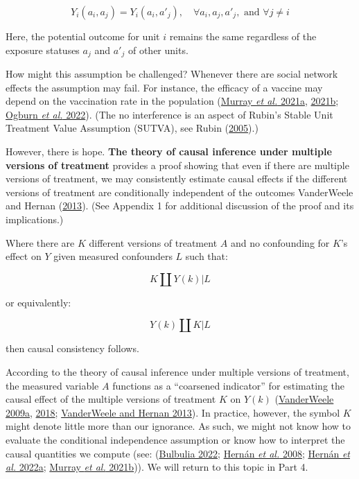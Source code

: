 \documentclass[
  singlecolumn]{article}
\begin{document}
\[
Y_i(a_i, a_j) = Y_i(a_i, a'_j), \quad \forall a_i, a_j, a'_j, \text{ and } \forall j \neq i
\]

Here, the potential outcome for unit \(i\) remains the same regardless
of the exposure statuses \(a_j\) and \(a'_j\) of other units.

How might this assumption be challenged? Whenever there are social
network effects the assumption may fail. For instance, the efficacy of a
vaccine may depend on the vaccination rate in the population
(\protect\hyperlink{ref-murray2021}{Murray \emph{et al.} 2021a},
\protect\hyperlink{ref-murray2021a}{2021b};
\protect\hyperlink{ref-ogburn2022}{Ogburn \emph{et al.} 2022}). (The no
interference is an aspect of Rubin's Stable Unit Treatment Value
Assumption (SUTVA), see Rubin
(\protect\hyperlink{ref-rubin2005}{2005}).)

However, there is hope. \textbf{The theory of causal inference under
multiple versions of treatment} provides a proof showing that even if
there are multiple versions of treatment, we may consistently estimate
causal effects if the different versions of treatment are conditionally
independent of the outcomes VanderWeele and Hernan
(\protect\hyperlink{ref-vanderweele2013}{2013}). (See Appendix 1 for
additional discussion of the proof and its implications.)

Where there are \(K\) different versions of treatment \(A\) and no
confounding for \(K\)'s effect on \(Y\) given measured confounders \(L\)
such that:

\[
K \coprod Y(k) | L
\]

or equivalently:

\[
Y(k) \coprod K | L
\]

then causal consistency follows.

According to the theory of causal inference under multiple versions of
treatment, the measured variable \(A\) functions as a ``coarsened
indicator'' for estimating the causal effect of the multiple versions of
treatment \(K\) on \(Y(k)\)
(\protect\hyperlink{ref-vanderweele2009}{VanderWeele 2009a},
\protect\hyperlink{ref-vanderweele2018}{2018};
\protect\hyperlink{ref-vanderweele2013}{VanderWeele and Hernan 2013}).
In practice, however, the symbol \(K\) might denote little more than our
ignorance. As such, we might not know how to evaluate the conditional
independence assumption or know how to interpret the causal quantities
we compute (see: (\protect\hyperlink{ref-bulbulia2022}{Bulbulia 2022};
\protect\hyperlink{ref-hernuxe1n2008}{Hernán \emph{et al.} 2008};
\protect\hyperlink{ref-hernuxe1n2022a}{Hernán \emph{et al.} 2022a};
\protect\hyperlink{ref-murray2021a}{Murray \emph{et al.} 2021b})). We
will return to this topic in Part 4.
\end{document}
